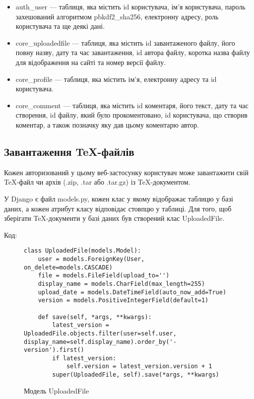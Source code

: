 \documentclass[a4paper,14pt]{extarticle}
\numberwithin{figure}{section}
\begin{document}
    \begin{itemize}
    \item auth\_user --- таблиця, яка містить id користувача, ім'я користувача, пароль захешований алгоритмом pbkdf2\_sha256, електронну адресу, роль користувача та ще деякі дані.

    \item core\_uploadedfile --- таблиця, яка містить id завантаженого файлу, його повну назву, дату та час завантаження, id автора файлу, коротка назва файлу для відображення на сайті та номер версії файлу.

    \item core\_profile --- таблиця, яка містить ім'я, електронну адресу та id користувача.

    \item core\_comment --- таблиця, яка містить id коментаря, його текст, дату та час створення, id файлу, який було прокоментовано, id користувача, що створив коментар, а також позначку яку дав цьому коментарю автор.
   
    \end{itemize}
    
    \newpage
    \subsection{\large Завантаження TeX-файлів}

    Кожен авторизований у цьому веб-застосунку користувач може завантажити свій TeX-файл чи архів (.zip, .tar або .tar.gz) із TeX-документом. 

    У Django є файл models.py, кожен клас у якому відображає таблицю у базі даних, а кожен атрибут класу відповідає стовпцю у таблиці. Для того, щоб зберігати TeX-документи у базі даних був створений клас UploadedFile.

    Код:
    \begin{figure}[h]
    \centering
    \begin{lstlisting}[style=mystyle]
class UploadedFile(models.Model):
    user = models.ForeignKey(User, on_delete=models.CASCADE)
    file = models.FileField(upload_to='')
    display_name = models.CharField(max_length=255)
    upload_date = models.DateTimeField(auto_now_add=True)
    version = models.PositiveIntegerField(default=1)

    def save(self, *args, **kwargs):
        latest_version = UploadedFile.objects.filter(user=self.user, display_name=self.display_name).order_by('-version').first()
        if latest_version:
            self.version = latest_version.version + 1
        super(UploadedFile, self).save(*args, **kwargs)
    \end{lstlisting}
    \caption{\normalsize Модель UploadedFile}
    \end{figure}
    
\end{document}

